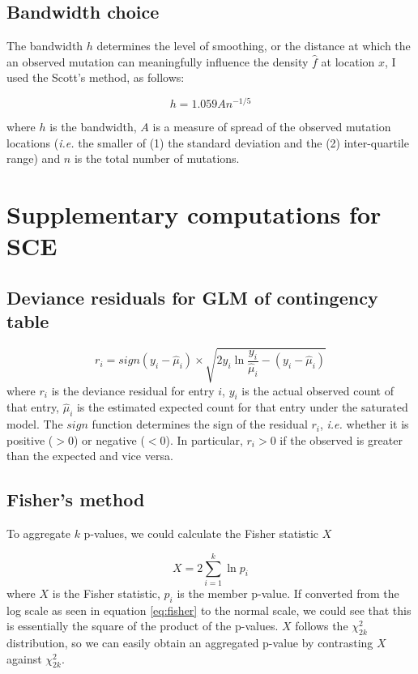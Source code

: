 \subsection{Bandwidth choice}
The bandwidth $h$ determines the level of smoothing, or the distance at which the an observed mutation can meaningfully influence the density $\hat{f}$ at location $x$, I used the Scott's method, as follows:

\begin{equation}
    h = 1.059 A n^{-1/5}
    \label{eq:bandwidth}
\end{equation}

where $h$ is the bandwidth, $A$ is a measure of spread of the observed mutation locations (\textit{i.e.} the smaller of (1) the standard deviation and the (2) inter-quartile range) and $n$ is the total number of mutations.


\newpage
\section{Supplementary computations for SCE}

\subsection{Deviance residuals for GLM of contingency table}
\begin{equation}
    r_i = sign(y_i - \hat{\mu}_i) \times \sqrt{2y_i\ln{\frac{y_i}{\hat{\mu}_i}} - (y_i - \hat{\mu}_i)}
    \label{eq:dev_res}
\end{equation}
where $r_i$ is the deviance residual for entry $i$, $y_i$ is the actual observed count of that entry, $\hat{\mu}_i$ is the estimated expected count for that entry under the saturated model. The $sign$ function determines the sign of the residual $r_i$, \textit{i.e.} whether it is positive ($>$0) or negative ($<$0). In particular, $r_i>0$ if the observed is greater than the expected and vice versa. 

\subsection{Fisher's method}\label{apdx:fisher}
To aggregate $k$ p-values, we could calculate the Fisher statistic $X$

\begin{equation}
    X = 2 \sum_{i=1}^k \ln{p_i}
    \label{eq:fisher}
\end{equation}
where $X$ is the Fisher statistic, $p_i$ is the member p-value. If converted from the log scale as seen in equation \ref{eq:fisher} to the normal scale, we could see that this is essentially the square of the product of the p-values. $X$ follows the $\chi^2_{2k}$ distribution, so we can easily obtain an aggregated p-value by contrasting $X$ against $\chi^2_{2k}$.

